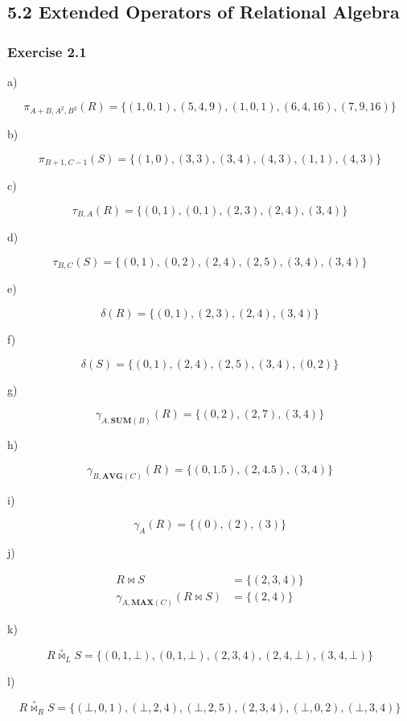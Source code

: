 \documentclass[../../main.tex]{subfiles}
\begin{document}
\subsection{5.2 Extended Operators of Relational Algebra}

\subsubsection*{Exercise 2.1}

a)

$$
\pi_{A + B, A^2, B^2}(R) = \{(1, 0, 1), (5, 4, 9),
  (1, 0, 1), (6, 4, 16), (7, 9, 16)\}
$$

b)

$$
\pi_{B + 1, C - 1}(S) = \{(1, 0), (3, 3), (3, 4),
  (4, 3), (1, 1), (4, 3)\}
$$

c)

$$
\tau_{B, A}(R) = \{(0, 1), (0, 1), (2, 3),
  (2, 4), (3, 4)\}
$$

d)

$$
\tau_{B, C}(S) = \{(0, 1), (0, 2), (2, 4),
  (2, 5), (3, 4), (3, 4)\}
$$

e)

$$
\delta(R) = \{(0, 1), (2, 3), (2, 4), (3, 4)\}
$$

f)

$$
\delta(S) = \{(0, 1), (2, 4), (2, 5),
  (3, 4), (0, 2)\}
$$

g)

$$
\gamma_{A, \mathbf{SUM}(B)}(R) = \{(0, 2), (2, 7),
  (3, 4)\}
$$

h)

$$
\gamma_{B, \mathbf{AVG}(C)}(R) = \{(0, 1.5), (2, 4.5),
  (3, 4)\}
$$

i)

$$
\gamma_{A}(R) = \{(0), (2), (3)\}
$$

j)

\begin{align*}
  R \bowtie S &= \{(2, 3 , 4)\} \\
  \gamma_{A, \mathbf{MAX}(C)}(R \bowtie S) &= \{(2, 4)\}
\end{align*}

k)

$$
R \overset{\circ}{\bowtie}_{L} S = \{(0, 1, \bot),
  (0, 1, \bot), (2, 3, 4), (2, 4, \bot), (3, 4, \bot)\}
$$

l)

$$
R \overset{\circ}{\bowtie}_{R} S = \{(\bot, 0 , 1),
  (\bot, 2 , 4), (\bot, 2, 5), (2, 3, 4), (\bot, 0, 2),
  (\bot, 3, 4)\}
$$
\end{document}
